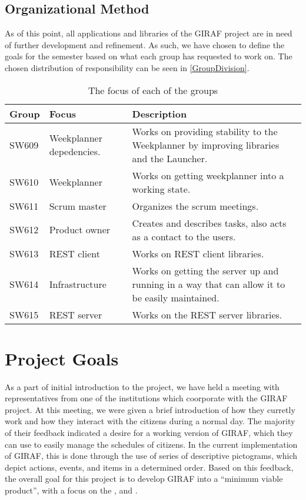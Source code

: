 \subsection{Organizational Method}
As of this point, all applications and libraries of the GIRAF project are in
need of further development and refinement. As such, we have chosen to define
the goals for the semester based on what each group has requested to work on.
The chosen distribution of responsibility can be seen in
\autoref{GroupDivision}.

\begin{table}[H]
\centering
\begin{tabular}{|p{2cm}|p{3cm}|p{8cm}|}
\hline
Group & Focus & Description \\ \hline
SW609 & Weekplanner depedencies. & Works on providing
stability to the Weekplanner by improving libraries and the Launcher.\\\hline 
SW610 & Weekplanner & Works on getting weekplanner into a working
state.\\\hline 
SW611 & Scrum master & Organizes the scrum meetings. \\\hline 
SW612 & Product owner & Creates and describes tasks, also acts as a contact to
the users. \\\hline 
SW613 & REST client & Works on REST client libraries.\\ \hline

SW614 & Infrastructure & Works on getting the server up and running in a way
that can allow it to be easily maintained. \\\hline

SW615 & REST server & Works on the REST server libraries.\\ \hline

\end{tabular}
\caption{The focus of each of the groups}
\label{GroupDivision}
\end{table}

\section{Project Goals}
As a part of initial introduction to the project, we have held a meeting with
representatives from one of the institutions which coorporate with the GIRAF
project. At this meeting, we were given a brief introduction of how they
curretly work and how they interact with the citizens during a normal day. The
majority of their feedback indicated a desire for a working version of GIRAF,
which they can use to easily manage the schedules of citizens. In the
current implementation of GIRAF, this is done through the use of series of
descriptive pictograms, which depict actions, events, and items in a determined
order. Based on this feedback, the overall goal for this project is to develop
GIRAF into a ``minimum viable product'', with a focus on the
,  and .\nl

